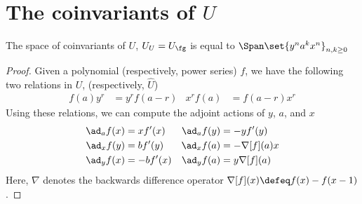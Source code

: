 \documentclass{article}
\begin{document}
\section{The coinvariants of $U$}

\begin{theorem}
        The space of coinvariants of $U$, $U_U = U_\fg$ is equal to 
        $\Span\set{y^n a^k x^n}_{n, k\ge 0}$
\end{theorem}
\begin{proof}
Given a polynomial (respectively, power series) $f$, we have the following two
relations in $U$, (respectively, $\widehat U$)
\begin{align}
        f(a)y^r &= y^rf(a-r) &
        x^rf(a) &= f(a-r)x^r 
\end{align}
Using these relations, we can compute the adjoint actions of $y$, $a$, and $x$
\begin{align}
  \ad_a f(x) &= xf'(x)&
  \ad_a f(y) &= -yf'(y)\label{eq:ada}\\
  \ad_x f(y) &= bf'(y) &
  \ad_x f(a) &= -\nabla[f](a)x\label{eq:adx}\\
  \ad_y f(x) &= -bf'(x) &
  \ad_y f(a) &= y\nabla[f](a)\label{eq:ady}
\end{align}
Here, $\nabla$ denotes the backwards difference operator $\nabla[f](x) \defeq
f(x) - f(x-1)$.
        
\end{proof}
\end{document}
